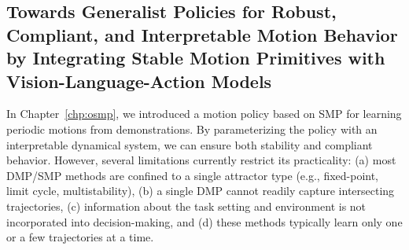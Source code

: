 \subsection{Towards Generalist Policies for Robust, Compliant, and Interpretable Motion Behavior by Integrating Stable Motion Primitives with Vision-Language-Action Models}
In Chapter~\ref{chp:osmp}, we introduced a motion policy based on \gls{SMP} for learning periodic motions from demonstrations. By parameterizing the policy with an interpretable dynamical system, we can ensure both stability and compliant behavior. However, several limitations currently restrict its practicality: (a) most \gls{DMP}/\gls{SMP} methods are confined to a single attractor type (e.g., fixed-point, limit cycle, multistability), (b) a single \gls{DMP} cannot readily capture intersecting trajectories, (c) information about the task setting and environment is not incorporated into decision-making, and (d) these methods typically learn only one or a few trajectories at a time.

